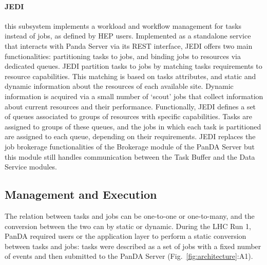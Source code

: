 \paragraph{\textbf{JEDI}} this subsystem implements a workload and workflow
management for tasks instead of jobs, as defined by HEP users. Implemented as a
standalone service that interacts with Panda Server via its REST interface, JEDI
offers two main functionalities: partitioning tasks to jobs, and binding jobs to
resources via dedicated queues. JEDI partition tasks to jobs by matching tasks
requirements to resource capabilities. This matching is based on tasks
attributes, and static and dynamic information about the resources of each
available site. Dynamic information is acquired via a small number of `scout'
jobs that collect information about current resources and their performance.
Functionally, JEDI defines a set of queues associated to groups of resources
with specific capabilities. Tasks are assigned to groups of these queues, and
the jobs in which each task is partitioned are assigned to each queue, depending
on their requirements. JEDI replaces the job brokerage functionalities of the
Brokerage module of the PanDA Server but this module still handles communication
between the Task Buffer and the Data Service modules.


\subsection{Management and Execution}
\label{ssec:panda_exec}


The relation between tasks and jobs can be one-to-one or one-to-many, and the
conversion between the two can by static or dynamic. During the LHC Run 1, PanDA
required users or the application layer to perform a static conversion between
tasks and jobs: tasks were described as a set of jobs with a fixed number of
events and then submitted to the PanDA Server (Fig.~\ref{fig:architecture}:A1).

